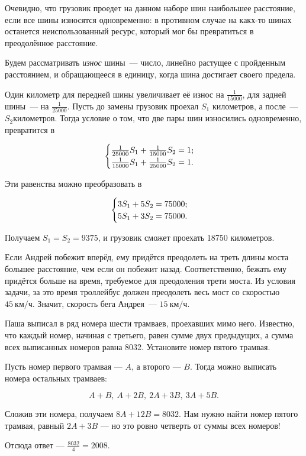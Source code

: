 \begin{itemize}

\itA Очевидно, что грузовик проедет на данном наборе шин наибольшее расстояние, если все шины износятся одновременно: в противном случае на какх-то шинах останется неиспользованный ресурс, который мог бы превратиться в преодолённое расстояние.

Будем рассматривать {\it износ} шины~— число, линейно растущее с пройденным расстоянием, и обращающееся в единицу, когда шина достигает своего предела.

Один километр для передней шины увеличивает её износ на $\tfrac{1}{15000}$, для задней шины~— на $\tfrac{1}{25000}$. Пусть до замены грузовик проехал $S_1$ километров, а после~— $S_2 километров$. Тогда условие о том, что две пары шин износились одновременно, превратится в

$$
\begin{cases}
	\frac{1}{25000}S_1 + \frac{1}{15000}S_2 = 1\scolon \\
	\frac{1}{15000}S_1 + \frac{1}{25000}S_2 = 1.
\end{cases}
$$

Эти равенства можно преобразовать в

$$
\begin{cases}
	3S_1 + 5S_2 = 75000\scolon \\
	5S_1 + 3S_2 = 75000.
\end{cases}
$$

Получаем $S_1 = S_2 = 9375$, и грузовик сможет проехать 18750 километров.


\itB Если Андрей побежит вперёд, ему придётся преодолеть на треть длины моста большее расстояние, чем если он побежит назад. Соответственно, бежать ему придётся больше на время, требуемое для преодоления трети моста. Из условия задачи, за это время троллейбус должен преодолеть весь мост со скоростью $\SI{45}{\text{км}/\text{ч}}$. Значит, скорость бега Андрея~— $\SI{15}{\text{км}/\text{ч}}$.

\itC Паша выписал в ряд номера шести трамваев, проехавших мимо него. Известно, что каждый номер, начиная с третьего, равен сумме двух предыдущих, а сумма всех выписанных номеров равна 8032. Установите номер пятого трамвая.

Пусть номер первого трамвая — $A$, а второго — $B$. Тогда можно выписать номера остальных трамваев:

$$A+B,\ A+2B,\ 2A+3B,\ 3A+5B.$$

Сложив эти номера, получаем $8A + 12B = 8032$. Нам нужно найти номер пятого трамвая, равный $2A+3B$ — но это ровно четверть от суммы всех номеров!

Отсюда ответ — $\tfrac{8032}{4} = 2008.$
\end{itemize}